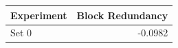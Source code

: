 \begin{tabular}{lr}
\toprule
Experiment & Block Redundancy \\
\midrule
Set 0 & -0.0982 \\
\bottomrule
\end{tabular}
